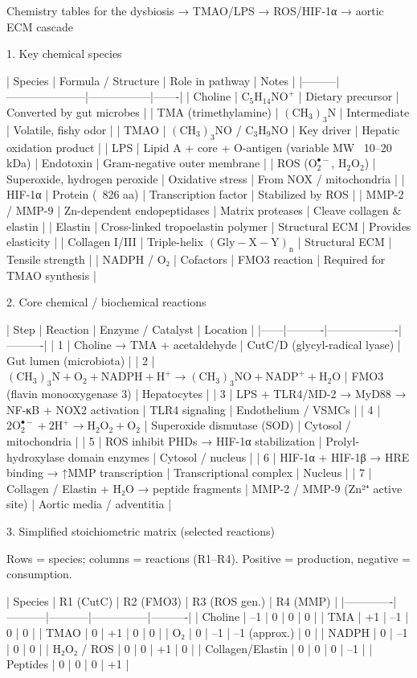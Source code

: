 Chemistry tables for the dysbiosis → TMAO/LPS → ROS/HIF-1α → aortic ECM cascade

1. Key chemical species

| Species | Formula / Structure | Role in pathway | Notes |
|---------|---------------------|-----------------|-------|
| Choline | \(\mathrm{C_5H_{14}NO^+}\) | Dietary precursor | Converted by gut microbes |
| TMA (trimethylamine) | \(\mathrm{(CH_3)_3N}\) | Intermediate | Volatile, fishy odor |
| TMAO | \(\mathrm{(CH_3)_3NO}\) / \(\mathrm{C_3H_9NO}\) | Key driver | Hepatic oxidation product |
| LPS | Lipid A + core + O-antigen (variable MW ~10–20 kDa) | Endotoxin | Gram-negative outer membrane |
| ROS (\(\mathrm{O_2^{\bullet-}}\), \(\mathrm{H_2O_2}\)) | Superoxide, hydrogen peroxide | Oxidative stress | From NOX / mitochondria |
| HIF-1α | Protein (~826 aa) | Transcription factor | Stabilized by ROS |
| MMP-2 / MMP-9 | Zn-dependent endopeptidases | Matrix proteases | Cleave collagen & elastin |
| Elastin | Cross-linked tropoelastin polymer | Structural ECM | Provides elasticity |
| Collagen I/III | Triple-helix \(\mathrm{(Gly-X-Y)_n}\) | Structural ECM | Tensile strength |
| NADPH / O₂ | Cofactors | FMO3 reaction | Required for TMAO synthesis |

2. Core chemical / biochemical reactions

| Step | Reaction | Enzyme / Catalyst | Location |
|------|----------|-------------------|----------|
| 1 | Choline → TMA + acetaldehyde | CutC/D (glycyl-radical lyase) | Gut lumen (microbiota) |
| 2 | \(\mathrm{(CH_3)_3N + O_2 + NADPH + H^+ \to (CH_3)_3NO + NADP^+ + H_2O}\) | FMO3 (flavin monooxygenase 3) | Hepatocytes |
| 3 | LPS + TLR4/MD-2 → MyD88 → NF-κB + NOX2 activation | TLR4 signaling | Endothelium / VSMCs |
| 4 | \(\mathrm{2O_2^{\bullet-} + 2H^+ \to H_2O_2 + O_2}\) | Superoxide dismutase (SOD) | Cytosol / mitochondria |
| 5 | ROS inhibit PHDs → HIF-1α stabilization | Prolyl-hydroxylase domain enzymes | Cytosol / nucleus |
| 6 | HIF-1α + HIF-1β → HRE binding → ↑MMP transcription | Transcriptional complex | Nucleus |
| 7 | Collagen / Elastin + H₂O → peptide fragments | MMP-2 / MMP-9 (Zn²⁺ active site) | Aortic media / adventitia |

3. Simplified stoichiometric matrix (selected reactions)

Rows = species; columns = reactions (R1–R4). Positive = production, negative = consumption.

| Species     | R1 (CutC) | R2 (FMO3) | R3 (ROS gen.) | R4 (MMP) |
|-------------|-----------|-----------|---------------|----------|
| Choline     | –1        | 0         | 0             | 0        |
| TMA         | +1        | –1        | 0             | 0        |
| TMAO        | 0         | +1        | 0             | 0        |
| O₂          | 0         | –1        | –1 (approx.)  | 0        |
| NADPH       | 0         | –1        | 0             | 0        |
| H₂O₂ / ROS  | 0         | 0         | +1            | 0        |
| Collagen/Elastin | 0    | 0         | 0             | –1       |
| Peptides    | 0         | 0         | 0             | +1       |

